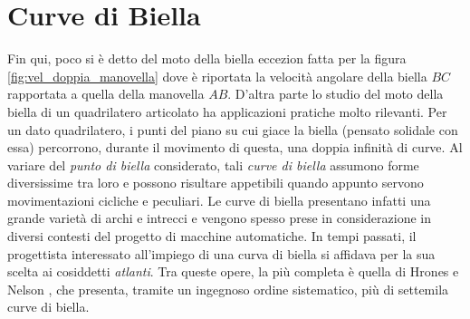 \section{Curve di Biella}

\noindent Fin qui, poco si \`e detto del moto della biella eccezion fatta per la 
figura \ref{fig:vel_doppia_manovella} dove \`e riportata la velocit\`a angolare
della biella $BC$ rapportata a quella della manovella $AB$.
D'altra parte lo studio del moto della biella di un quadrilatero articolato ha
applicazioni pratiche molto rilevanti.
Per un dato quadrilatero, i punti del piano su cui giace la
biella (pensato solidale con essa) percorrono, durante il movimento di questa, una doppia infinit\`a di curve.
Al variare del {\em punto di biella} considerato, tali
{\em curve di biella} assumono forme diversissime tra loro
e possono risultare appetibili quando appunto servono movimentazioni
cicliche e peculiari.
Le curve di biella presentano infatti una grande
variet\`a di archi e intrecci
e vengono spesso prese in considerazione in diversi contesti
del progetto di macchine automatiche.
In tempi passati, il progettista interessato all'impiego di una curva di biella
si affidava per la sua scelta ai cosiddetti {\em atlanti}.
Tra queste opere, la pi\`u
completa \`e quella di Hrones e Nelson \cite{hrones}, che presenta, tramite
un ingegnoso ordine sistematico, pi\`u di settemila curve di biella.  
